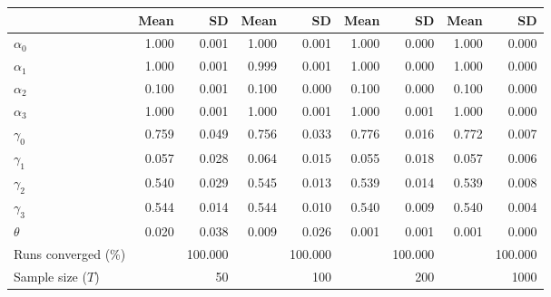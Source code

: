 
\begin{tabular}[t]{lrrrrrrrr}
\toprule
  & Mean & SD & Mean  & SD  & Mean   & SD   & Mean    & SD   \\
\midrule
$\alpha_{0}$ & 1.000 & 0.001 & 1.000 & 0.001 & 1.000 & 0.000 & 1.000 & 0.000\\
$\alpha_{1}$ & 1.000 & 0.001 & 0.999 & 0.001 & 1.000 & 0.000 & 1.000 & 0.000\\
$\alpha_{2}$ & 0.100 & 0.001 & 0.100 & 0.000 & 0.100 & 0.000 & 0.100 & 0.000\\
$\alpha_{3}$ & 1.000 & 0.001 & 1.000 & 0.001 & 1.000 & 0.001 & 1.000 & 0.000\\
$\gamma_{0}$ & 0.759 & 0.049 & 0.756 & 0.033 & 0.776 & 0.016 & 0.772 & 0.007\\
$\gamma_{1}$ & 0.057 & 0.028 & 0.064 & 0.015 & 0.055 & 0.018 & 0.057 & 0.006\\
$\gamma_{2}$ & 0.540 & 0.029 & 0.545 & 0.013 & 0.539 & 0.014 & 0.539 & 0.008\\
$\gamma_{3}$ & 0.544 & 0.014 & 0.544 & 0.010 & 0.540 & 0.009 & 0.540 & 0.004\\
$\theta$ & 0.020 & 0.038 & 0.009 & 0.026 & 0.001 & 0.001 & 0.001 & 0.000\\
Runs converged (\%) &  & 100.000 &  & 100.000 &  & 100.000 &  & 100.000\\
Sample size ($T$) &  & 50 &  & 100 &  & 200 &  & 1000\\
\bottomrule
\end{tabular}
